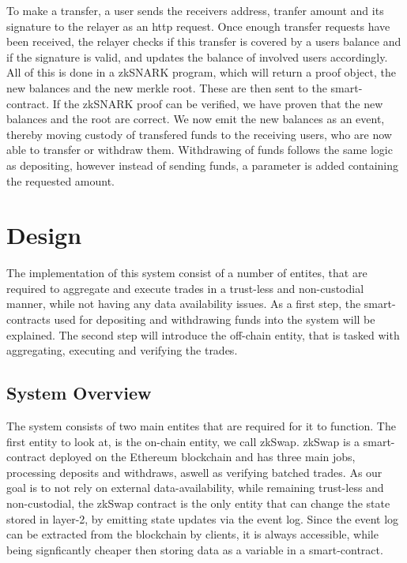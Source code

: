\documentclass[11pt,twoside,a4paper,final]{book}
\begin{document}
To make a transfer, a user sends the receivers address, tranfer amount and its signature to the relayer as an http request. Once enough transfer requests have been received, the relayer checks if this transfer is covered by a users balance and if the signature is valid, and updates the balance of involved users accordingly. All of this is done in a zkSNARK program, which will return a proof object, the new balances and the new merkle root. These are then sent to the smart-contract. If the zkSNARK proof can be verified, we have proven that the new balances and the root are correct. We now emit the new balances as an event, thereby moving custody of transfered funds to the receiving users, who are now able to transfer or withdraw them. Withdrawing of funds follows the same logic as depositing, however instead of sending funds, a parameter is added containing the requested amount. 

\section{Design}
The implementation of this system consist of a number of entites, that are required to aggregate and execute trades in a trust-less and non-custodial manner, while not having any data availability issues. As a first step, the smart-contracts used for depositing and withdrawing funds into the system will be explained. The second step will introduce the off-chain entity, that is tasked with aggregating, executing and verifying the trades.

\subsection{System Overview}
The system consists of two main entites that are required for it to function. The first entity to look at, is the on-chain entity, we call zkSwap. zkSwap is a smart-contract deployed on the Ethereum blockchain and has three main jobs, processing deposits and withdraws, aswell as verifying batched trades. As our goal is to not rely on external data-availability, while remaining trust-less and non-custodial, the zkSwap contract is the only entity that can change the state stored in layer-2, by emitting state updates via the event log. Since the event log can be extracted from the blockchain by clients, it is always accessible, while being signficantly cheaper then storing data as a variable in a smart-contract.
\end{document}
